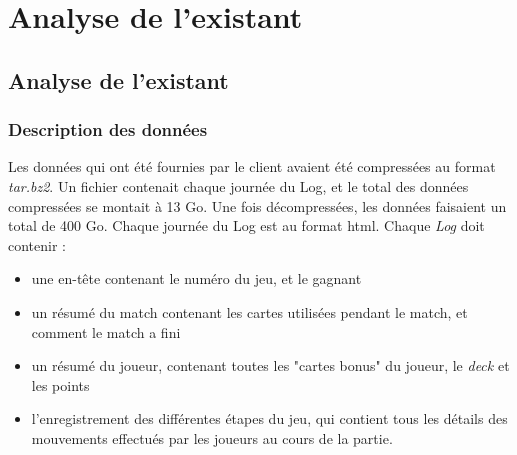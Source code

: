 \chapter{Analyse de l'existant}

\section{Analyse de l'existant}

\subsection{Description des données}
Les données qui ont été fournies par le client avaient été compressées au format \textit{tar.bz2}. Un fichier contenait chaque journée du Log, et le total des données compressées se montait à 13 Go. Une fois décompressées, les données faisaient un total de 400 Go. 
Chaque journée du Log est au format html. 
Chaque \textit{Log} doit contenir : 
\begin{itemize}
\item une en-tête contenant le numéro du jeu, et le gagnant
\item un résumé du match contenant les cartes utilisées pendant le match, et comment le match a fini
\item un résumé du joueur, contenant toutes les "cartes bonus" du joueur, le \textit{deck} et les points
\item l'enregistrement des différentes étapes du jeu, qui contient tous les détails des mouvements effectués par les joueurs au cours de la partie.  
\end{itemize}

